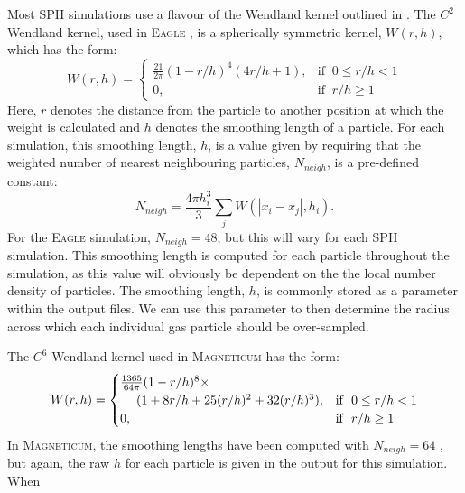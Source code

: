 \documentclass[
  journal=pasa,
  manuscript=research-paper, %
  year=2020,
  volume=37,
]{cup-journal}
\newcommand{\eagle}[1]{\textsc{Eagle}#1} %
\newcommand{\magneticum}[1]{\textsc{Magneticum}#1} %
\begin{document}
Most SPH simulations use a flavour of the Wendland kernel outlined in \citealt{Wendland1995PiecewiseDegree}. 
The $C^{2}$ Wendland kernel, used in \eagle{} \citep{Schaller2015TheScheme}, is a spherically symmetric kernel, $W(r,h)$, which has the form: 
\begin{equation}
    W(r,h) =
    \begin{cases}
        \frac{21}{2 \pi}(1 - r/h)^4 (4r/h + 1),& \text{if }\ 0 \leq r/h < 1\\
        0,                                     & \text{if }\ r/h \geq 1
    \end{cases}
\end{equation}
Here, $r$ denotes the distance from the particle to another position at which the weight is calculated and $h$ denotes the smoothing length of a particle. 
For each simulation, this smoothing length, $h$, is a value given by requiring that the weighted number of nearest neighbouring particles, $N_{neigh}$, is a pre-defined constant:
\begin{equation}
    N_{neigh} = \frac{4 \pi h_i^3}{3} \sum_j W\left(|x_i - x_j|, h_i \right).
\end{equation}
For the \eagle{} simulation, $N_{neigh} = 48$, but this will vary for each SPH simulation.
This smoothing length is computed for each particle throughout the simulation, as this value will obviously be dependent on the the local number density of particles.
The smoothing length, $h$, is commonly stored as a parameter within the output files. 
We can use this parameter to then determine the radius across which each individual gas particle should be over-sampled.   

The $C^{6}$ Wendland kernel used in \magneticum{} \citep{Teklu2015ConnectingMorphology} has the form:
\begin{equation}
    W(r,h) =
    \begin{cases}
        \frac{1365}{64 \pi}(1 - r/h)^8 \times \\ \hspace{3ex} (1 + 8 r/h  + 25 (r/h)^2 + 32 (r/h)^3),& \text{if }\ 0 \leq r/h < 1\\
        0,                                     & \text{if }\ r/h \geq 1
    \end{cases}
\end{equation}
In \magneticum{,} the smoothing lengths have been computed with $N_{neigh}=64$ \citep{Beck2016Ansimulations}, but again, the raw $h$ for each particle is given in the output for this simulation. 
When 
\end{document}
